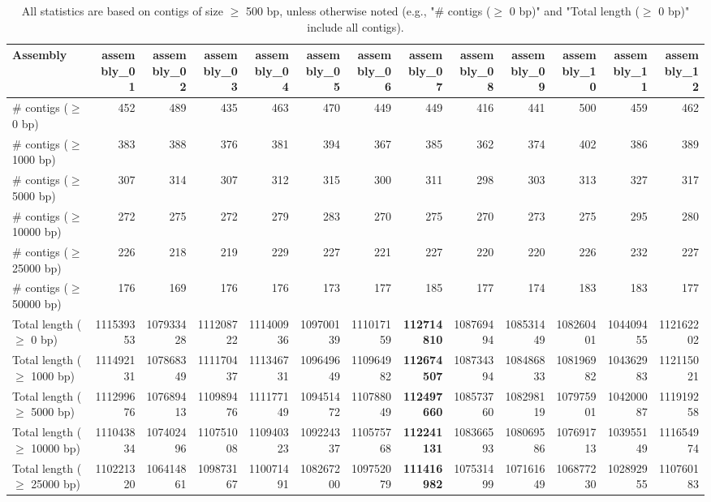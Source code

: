 \documentclass[12pt,a4paper]{article}
\begin{document}
\begin{table}[ht]
\begin{center}
\caption{All statistics are based on contigs of size $\geq$ 500 bp, unless otherwise noted (e.g., "\# contigs ($\geq$ 0 bp)" and "Total length ($\geq$ 0 bp)" include all contigs).}
\begin{tabular}{|l*{12}{|r}|}
\hline
Assembly & assembly\_01 & assembly\_02 & assembly\_03 & assembly\_04 & assembly\_05 & assembly\_06 & assembly\_07 & assembly\_08 & assembly\_09 & assembly\_10 & assembly\_11 & assembly\_12 \\ \hline
\# contigs ($\geq$ 0 bp) & 452 & 489 & 435 & 463 & 470 & 449 & 449 & 416 & 441 & 500 & 459 & 462 \\ \hline
\# contigs ($\geq$ 1000 bp) & 383 & 388 & 376 & 381 & 394 & 367 & 385 & 362 & 374 & 402 & 386 & 389 \\ \hline
\# contigs ($\geq$ 5000 bp) & 307 & 314 & 307 & 312 & 315 & 300 & 311 & 298 & 303 & 313 & 327 & 317 \\ \hline
\# contigs ($\geq$ 10000 bp) & 272 & 275 & 272 & 279 & 283 & 270 & 275 & 270 & 273 & 275 & 295 & 280 \\ \hline
\# contigs ($\geq$ 25000 bp) & 226 & 218 & 219 & 229 & 227 & 221 & 227 & 220 & 220 & 226 & 232 & 227 \\ \hline
\# contigs ($\geq$ 50000 bp) & 176 & 169 & 176 & 176 & 173 & 177 & 185 & 177 & 174 & 183 & 183 & 177 \\ \hline
Total length ($\geq$ 0 bp) & 111539353 & 107933428 & 111208722 & 111400936 & 109700139 & 111017159 & {\bf 112714810} & 108769494 & 108531449 & 108260401 & 104409455 & 112162202 \\ \hline
Total length ($\geq$ 1000 bp) & 111492131 & 107868349 & 111170437 & 111346731 & 109649649 & 110964982 & {\bf 112674507} & 108734394 & 108486833 & 108196982 & 104362983 & 112115021 \\ \hline
Total length ($\geq$ 5000 bp) & 111299676 & 107689413 & 110989476 & 111177149 & 109451472 & 110788049 & {\bf 112497660} & 108573760 & 108298119 & 107975901 & 104200087 & 111919258 \\ \hline
Total length ($\geq$ 10000 bp) & 111043834 & 107402496 & 110751008 & 110940323 & 109224337 & 110575768 & {\bf 112241131} & 108366593 & 108069586 & 107691713 & 103955149 & 111654974 \\ \hline
Total length ($\geq$ 25000 bp) & 110221320 & 106414861 & 109873167 & 110071491 & 108267200 & 109752079 & {\bf 111416982} & 107531499 & 107161649 & 106877230 & 102892955 & 110760183 \\ \hline

\end{tabular}
\end{center}
\end{table}
\end{document}
